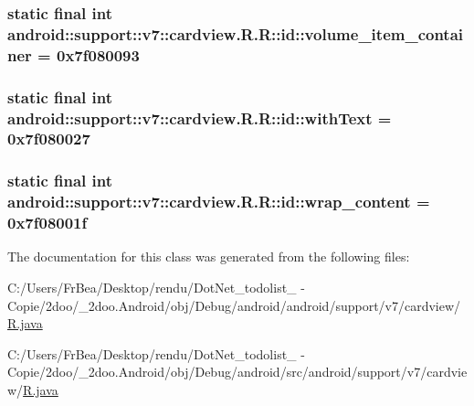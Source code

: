 \hypertarget{classandroid_1_1support_1_1v7_1_1cardview_1_1_r_1_1id_ff092ff6f37f9dabcd8c73f9554b3c1c}{
\subsubsection[{volume\_\-item\_\-container}]{\setlength{\rightskip}{0pt plus 5cm}static final int android::support::v7::cardview.R.R::id::volume\_\-item\_\-container = 0x7f080093}}
\label{classandroid_1_1support_1_1v7_1_1cardview_1_1_r_1_1id_ff092ff6f37f9dabcd8c73f9554b3c1c}


\hypertarget{classandroid_1_1support_1_1v7_1_1cardview_1_1_r_1_1id_9b2a9bea2e6d7f10c34f29a85fd09bf0}{
\subsubsection[{withText}]{\setlength{\rightskip}{0pt plus 5cm}static final int android::support::v7::cardview.R.R::id::withText = 0x7f080027}}
\label{classandroid_1_1support_1_1v7_1_1cardview_1_1_r_1_1id_9b2a9bea2e6d7f10c34f29a85fd09bf0}


\hypertarget{classandroid_1_1support_1_1v7_1_1cardview_1_1_r_1_1id_def8dafb8bcd9d3a42a480136960d87b}{
\subsubsection[{wrap\_\-content}]{\setlength{\rightskip}{0pt plus 5cm}static final int android::support::v7::cardview.R.R::id::wrap\_\-content = 0x7f08001f}}
\label{classandroid_1_1support_1_1v7_1_1cardview_1_1_r_1_1id_def8dafb8bcd9d3a42a480136960d87b}




The documentation for this class was generated from the following files:\begin{CompactItemize}
\item 
C:/Users/FrBea/Desktop/rendu/DotNet\_\-todolist\_ - Copie/2doo/\_\-2doo.Android/obj/Debug/android/android/support/v7/cardview/\hyperlink{android_2support_2v7_2cardview_2_r_8java}{R.java}\item 
C:/Users/FrBea/Desktop/rendu/DotNet\_\-todolist\_ - Copie/2doo/\_\-2doo.Android/obj/Debug/android/src/android/support/v7/cardview/\hyperlink{src_2android_2support_2v7_2cardview_2_r_8java}{R.java}\end{CompactItemize}
